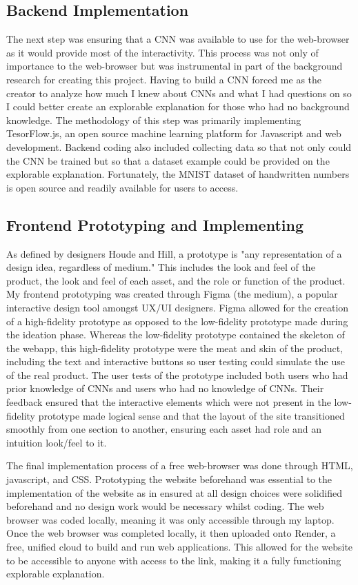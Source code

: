 \documentclass[10pt,twocolumn]{article}
\begin{document}
\subsection{Backend Implementation}
The next step was ensuring that a CNN was available to use for the web-browser as it would provide most of the interactivity. This process was not only of importance to the web-browser but was instrumental in part of the background research for creating this project. Having to build a CNN forced me as the creator to analyze how much I knew about CNNs and what I had questions on so I could better create an explorable explanation for those who had no background knowledge. The methodology of this step was primarily implementing TesorFlow.js, an open source machine learning platform for Javascript and web development. Backend coding also included collecting data so that not only could the CNN be trained but so that a dataset example could be provided on the explorable explanation. Fortunately, the MNIST dataset of handwritten numbers is open source and readily available for users to access. \cite{tensorflow2015-whitepaper}

\subsection{Frontend Prototyping and Implementing}
As defined by designers Houde and Hill, a prototype is "any representation of a design idea, regardless of medium." This includes the look and feel of the product, the look and feel of each asset, and the role or function of the product. \cite{prototyping} My frontend prototyping was created through Figma (the medium), a popular interactive design tool amongst UX/UI designers. Figma allowed for the creation of a high-fidelity prototype as opposed to the low-fidelity prototype made during the ideation phase. Whereas the low-fidelity prototype contained the skeleton of the webapp, this high-fidelity prototype were the meat and skin of the product, including the text and interactive buttons so user testing could simulate the use of the real product. The user tests of the prototype included both users who had prior knowledge of CNNs and users who had no knowledge of CNNs. Their feedback ensured that the interactive elements which were not present in the low-fidelity prototype made logical sense and that the layout of the site transitioned smoothly from one section to another, ensuring each asset had role and an intuition look/feel to it. 


The final implementation process of a free web-browser was done through HTML, javascript, and CSS. Prototyping the website beforehand was essential to the implementation of the website as in ensured at all design choices were solidified beforehand and no design work would be necessary whilst coding. The web browser was coded locally, meaning it was only accessible through my laptop. Once the web browser was completed locally, it then uploaded onto Render, a free, unified cloud to build and run web applications. This allowed for the website to be accessible to anyone with access to the link, making it a fully functioning explorable explanation. 
\end{document}
